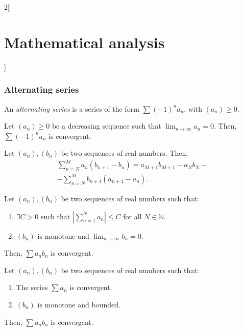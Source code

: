 \documentclass[class=article,crop=false]{standalone}
\begin{document}
\begin{multicols}{2}[\section{Mathematical analysis}]
\subsubsection*{Alternating series}
\begin{definition}
An \textit{alternating series} is a series of the form $\sum (-1)^na_n$, with $(a_n)\geq 0$.
\end{definition}
\begin{theorem}
Let $(a_n)\geq 0$ be a decreasing sequence such that $\displaystyle\lim_{n\to\infty}a_n=0$. Then, $\sum (-1)^na_n$ is convergent.
\end{theorem}
\begin{theorem}
Let $(a_n),(b_n)$ be two sequences of real numbers. Then, 
\begin{multline*}
\sum_{n=N}^M a_n(b_{n+1}-b_n)=a_{M+1}b_{M+1}-a_Nb_N-\\
-\sum_{n=N}^Mb_{n+1}(a_{n+1}-a_n).
\end{multline*}
\end{theorem}
\begin{theorem}
Let $(a_n),(b_n)$ be two sequences of real numbers such that:
\begin{enumerate}
    \item $\exists C>0$ such that $\displaystyle\left|\sum_{n=1}^Na_n\right|\leq C$ for all $N\in\mathbb{N}$.
    \item $(b_n)$ is monotone and $\displaystyle\lim_{n\to\infty}b_n=0$.
\end{enumerate}
Then, $\sum a_nb_n$ is convergent.
\end{theorem}
\begin{theorem}
Let $(a_n),(b_n)$ be two sequences of real numbers such that:
\begin{enumerate}
    \item The series $\sum a_n$ is convergent.
    \item $(b_n)$ is monotone and bounded.
\end{enumerate}
Then, $\sum a_nb_n$ is convergent.
\end{theorem}

\end{multicols}
\end{document}
